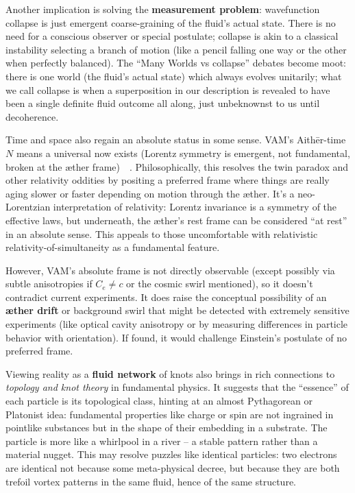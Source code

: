 \documentclass[a4paper,12pt]{article}
\begin{document}
    Another implication is solving the \textbf{measurement problem}: wavefunction collapse is just emergent coarse-graining of the fluid’s actual state. There is no need for a conscious observer or special postulate; collapse is akin to a classical instability selecting a branch of motion (like a pencil falling one way or the other when perfectly balanced). The “Many Worlds vs collapse” debates become moot: there is one world (the fluid’s actual state) which always evolves unitarily; what we call collapse is when a superposition in our description is revealed to have been a single definite fluid outcome all along, just unbeknownst to us until decoherence.

    Time and space also regain an absolute status in some sense. VAM’s Aithēr-time $N$ means a universal now exists (Lorentz symmetry is emergent, not fundamental, broken at the æther frame)~\cite{reference_234}~\cite{reference_235}. Philosophically, this resolves the twin paradox and other relativity oddities by positing a preferred frame where things are really aging slower or faster depending on motion through the æther. It’s a neo-Lorentzian interpretation of relativity: Lorentz invariance is a symmetry of the effective laws, but underneath, the æther’s rest frame can be considered “at rest” in an absolute sense. This appeals to those uncomfortable with relativistic relativity-of-simultaneity as a fundamental feature.

    However, VAM’s absolute frame is not directly observable (except possibly via subtle anisotropies if $C_e \neq c$ or the cosmic swirl mentioned), so it doesn’t contradict current experiments. It does raise the conceptual possibility of an \textbf{æther drift} or background swirl that might be detected with extremely sensitive experiments (like optical cavity anisotropy or by measuring differences in particle behavior with orientation). If found, it would challenge Einstein’s postulate of no preferred frame.

    Viewing reality as a \textbf{fluid network} of knots also brings in rich connections to \emph{topology and knot theory} in fundamental physics. It suggests that the “essence” of each particle is its topological class, hinting at an almost Pythagorean or Platonist idea: fundamental properties like charge or spin are not ingrained in pointlike substances but in the shape of their embedding in a substrate. The particle is more like a whirlpool in a river – a stable pattern rather than a material nugget. This may resolve puzzles like identical particles: two electrons are identical not because some meta-physical decree, but because they are both trefoil vortex patterns in the same fluid, hence of the same structure.
\end{document}
